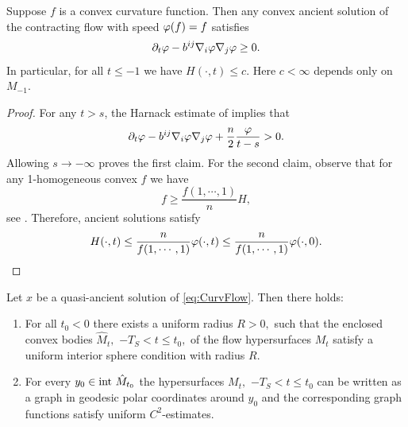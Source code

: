 \documentclass{amsart}
\begin{document}
\begin{proposition}
\label{cor:boundedH}
Suppose $f$ is a convex curvature function. Then any convex ancient solution of the contracting flow with speed $\varphi(f)=f$ satisfies
\[\partial_t \varphi-b^{ij}\nabla_i\varphi\nabla_j\varphi\geq 0.\]
In particular, for all $t\le -1$ we have
$H(\cdot,t)\leq c.$
Here $c<\infty$ depends only on $M_{-1}.$
\end{proposition}
\begin{proof}
For any $t>s$, the  Harnack estimate of \cite[Theorem 1]{bryan2015harnack} implies that
$$\partial_t \varphi-b^{ij}\nabla_i\varphi\nabla_j\varphi+\frac{n}{2}\frac{\varphi}{t-s}>0.$$
Allowing $s\to-\infty$ proves the first claim. For the second claim, observe that for any 1-homogeneous convex $f$ we have \[f\ge \frac{f(1,\cdots,1)}{n}H,\]
see \cite[Chapter 2]{Gerhardt:/2006}. Therefore, ancient solutions satisfy
\[H(\cdot,t)\leq \frac{n}{f(1,\cdots,1)}\varphi(\cdot,t)\leq \frac{n}{f(1,\cdots,1)}\varphi(\cdot,0). \]
\end{proof}
\begin{lemma}\label{ISC}
Let $x$ be a quasi-ancient solution of \eqref{eq:CurvFlow}. Then there holds:
\begin{enumerate}
  \item For all $t_0<0$ there exists a uniform radius $R>0,$ such that the enclosed convex bodies $\hat{M}_t,$ $-T_S<t\leq t_0,$ of the flow hypersurfaces $M_t$ satisfy a uniform interior sphere condition with radius $R.$
  \item For every $y_0\in\mathrm{int}~\hat{M}_{t_0}$ the hypersurfaces $M_t,$ $-T_S<t\leq t_0$ can be written as a graph in geodesic polar coordinates around $y_0$ and the corresponding graph functions satisfy uniform $C^2$-estimates.
\end{enumerate}
\end{lemma}
\end{document}
